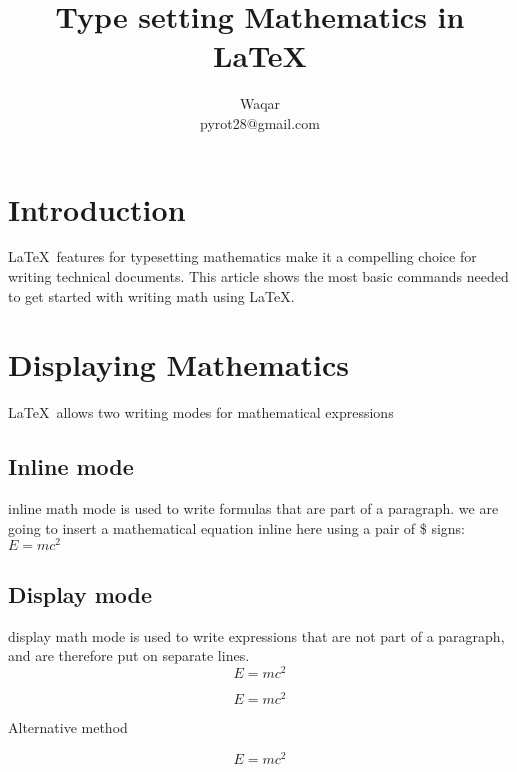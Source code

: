 \documentclass{article}
\begin{document}
	
\title{Type setting Mathematics in \LaTeX}
\author{Waqar \\pyrot28@gmail.com}
\maketitle
	
		

\section{Introduction}

\LaTeX\ features for typesetting mathematics make it a compelling choice for writing technical documents. This article shows the most basic commands needed to get started with writing math using \LaTeX.


\section{Displaying Mathematics}
\LaTeX\ allows two writing modes for mathematical expressions


\subsection{Inline mode}

inline math mode is used to write formulas that are part of a paragraph. we are going to insert a mathematical equation inline here using a pair of \$ signs: $ E = mc^2 $


\subsection{Display mode}
display math mode is used to write expressions that are not part of a paragraph, and are therefore put on separate lines.
\begin{equation}
	E = mc^2
\end{equation}


\begin{equation*}
	E = mc^2
	
\end{equation*}

Alternative method

\[
	E = mc^2
\]
\end{document}
